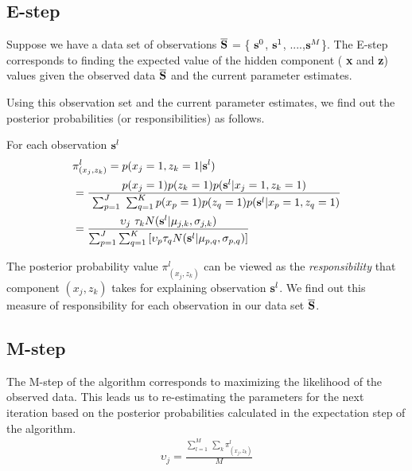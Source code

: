 \documentclass{Localization-PaperWriteupDraft}
\begin{document}
\subsection{E-step}
\label{subsec:estep}

Suppose we have a data set of observations  ${\bf \overline{S}}$ = \{
${\bf {s}}^{0}$, ${\bf {s}}^{1}$, ....,${\bf {s}}^{M}$\}. The E-step
corresponds to finding the expected value of the hidden component ({\bf
		x} and {\bf z}) values given the observed data  ${\bf \overline{S}}$ and the current parameter estimates.

Using this observation set and the current parameter estimates, we find out the posterior probabilities (or responsibilities) as follows. 

For each observation ${\bf {s}}^{l}$
\begin{align}
& \pi_{({x_{j}}, {z_{k}})}^{l}  = p({x_{j}} = 1, {z_{k}} = 1 | {\bf{s}}^{l}) \\ 
& = \frac { p({x_{j}} = 1)p({z_{k}} = 1)p( {\bf {s}}^{l} | {x_{j}} = 1, {z_{k}} = 1)} {\ \sum_{p=1}^J \ \sum_{q=1}^{K} p({x_{p}} = 1) p({z_{q}} = 1) p( {\bf {s}}^{l} | {x_{p}} = 1, {z_{q}} = 1)} \nonumber \\
& = \frac { \upsilon_{j} \ \tau_{k} N({\bf {s}}^{l} | {\bf {\mu}}_{j,k}, {\bf {\sigma}}_{j,k})} {\sum_{p=1}^J \sum_{q=1}^K \left[\upsilon_{p} \tau_{q} N({\bf {s}}^{l} | {\bf {\mu}}_{p,q}, {\bf {\sigma}}_{p,q})\right] }
\end{align}

The posterior probability value $\pi_{({x_{j}}, {z_{k}})}^{l}$ can be viewed as the {\it responsibility} that component $({x_{j}}, {z_{k}})$ takes for explaining observation ${\bf {s}}^{l}$. We find out this measure of responsibility for each observation in our data set ${\bf \overline{S}}$.

\subsection{M-step}
\label{subsec:mstep}

The M-step of the algorithm corresponds to maximizing the likelihood of
the observed data. This leads us to re-estimating the parameters for the next iteration based on the posterior probabilities calculated in the expectation step of the algorithm.
\begin{align}
\upsilon_{j} = \frac { \sum_{l=1}^{M} \ \sum_{k} \pi_{({x_{j}}, {z_{k}})}^{l}} {M}
\end{align}
\end{document}
